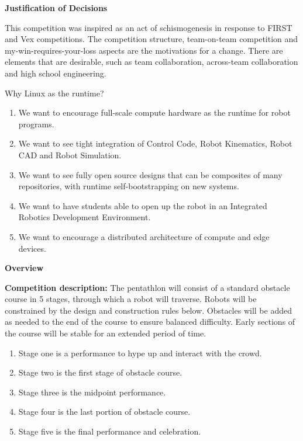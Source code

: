 \documentclass{article}
\begin{document}
{\huge \textbf{Justification of Decisions}}
\vspace{1cm}

This competition was inspired as an act of schismogenesis in response to FIRST and Vex competitions. The competition structure, team-on-team competition and my-win-requires-your-loss aspects are the motivations for a change. There are elements that are desirable, such as team collaboration, across-team collaboration and high school engineering. 

Why Linux as the runtime? 
\begin{enumerate}
\item We want to encourage full-scale compute hardware as the runtime for robot programs. 

\item We want to see tight integration of Control Code, Robot Kinematics, Robot CAD and Robot Simulation. 

\item We want to see fully open source designs that can be composites of many repositories, with runtime self-bootstrapping on new systems. 

\item We want to have students able to open up the robot in an Integrated Robotics Development Environment. 

\item We want to encourage a distributed architecture of compute and edge devices. 

\end{enumerate}
\pagebreak


{\huge \textbf{Overview}}
\vspace{1cm}

\textbf{Competition description:} The pentathlon will consist of a standard obstacle course in 5 stages, through which a robot will traverse. Robots will be constrained by the design and construction rules below. Obstacles will be added as needed to the end of the course to ensure balanced difficulty. Early sections of the course will be stable for an extended period of time. 
\begin{enumerate}
\item Stage one is a performance to hype up and interact with the crowd.

\item Stage two is the first stage of obstacle course. 

\item Stage three is the midpoint performance.

\item Stage four is the last portion of obstacle course. 

\item Stage five is the final performance and celebration. 
\end{enumerate}
\end{document}
